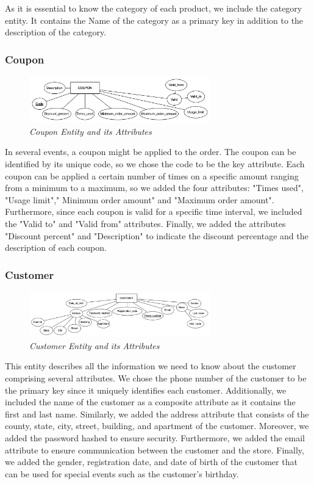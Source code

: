 \documentclass[11pt]{article}
\begin{document}
As it is essential to know the category of each product, we include the category entity. It contains the Name of the category as a primary key in addition to the description of the category.

\subsubsection{Coupon}
\begin{figure}[H]
  \centering
  \includegraphics[width=0.7\textwidth]{images/entities/coupon.png}
  \caption{\textit{Coupon Entity and its Attributes}}
\end{figure}

In several events, a coupon might be applied to the order. The coupon can be identified by its unique code, so we chose the code to be the key attribute. Each coupon can be applied a certain number of times on a specific amount ranging from a minimum to a maximum, so we added the four attributes: "Times used", "Usage limit"," Minimum order amount" and "Maximum order amount". Furthermore, since each coupon is valid for a specific time interval, we included the "Valid to" and "Valid from" attributes. Finally, we added the attributes "Discount percent" and "Description" to indicate the discount percentage and the description of each coupon.

\subsubsection{Customer}
\begin{figure}[H]
  \centering
  \includegraphics[width=0.7\textwidth]{images/entities/customer.png}
  \caption{\textit{Customer Entity and its Attributes}}
\end{figure}

This entity describes all the information we need to know about the customer comprising several attributes. We chose the phone number of the customer to be the primary key since it uniquely identifies each customer. Additionally, we included the name of the customer as a composite attribute as it contains the first and last name. Similarly, we added the address attribute that consists of the county, state, city, street, building, and apartment of the customer. Moreover, we added the password hashed to ensure security. Furthermore, we added the email attribute to ensure communication between the customer and the store. Finally, we added the gender, registration date, and date of birth of the customer that can be used for special events such as the customer's birthday.
\end{document}
